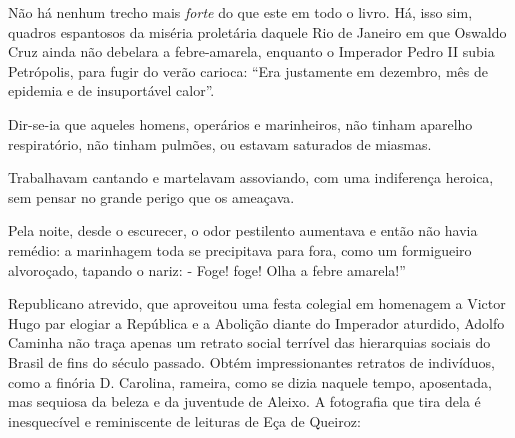 \documentclass[
  letterpaper,
  DIV=11,
  numbers=noendperiod]{scrreprt}
\begin{document}
Não há nenhum trecho mais \emph{forte} do que este em todo o livro. Há,
isso sim, quadros espantosos da miséria proletária daquele Rio de
Janeiro em que Oswaldo Cruz ainda não debelara a febre-amarela, enquanto
o Imperador Pedro II subia Petrópolis, para fugir do verão carioca:
``Era justamente em dezembro, mês de epidemia e de insuportável calor''.

Dir-se-ia que aqueles homens, operários e marinheiros, não tinham
aparelho respiratório, não tinham pulmões, ou estavam saturados de
miasmas.

Trabalhavam cantando e martelavam assoviando, com uma indiferença
heroica, sem pensar no grande perigo que os ameaçava.

Pela noite, desde o escurecer, o odor pestilento aumentava e então não
havia remédio: a marinhagem toda se precipitava para fora, como um
formigueiro alvoroçado, tapando o nariz: - Foge! foge! Olha a febre
amarela!''

Republicano atrevido, que aproveitou uma festa colegial em homenagem a
Victor Hugo par elogiar a República e a Abolição diante do Imperador
aturdido, Adolfo Caminha não traça apenas um retrato social terrível das
hierarquias sociais do Brasil de fins do século passado. Obtém
impressionantes retratos de indivíduos, como a finória D. Carolina,
rameira, como se dizia naquele tempo, aposentada, mas sequiosa da beleza
e da juventude de Aleixo. A fotografia que tira dela é inesquecível e
reminiscente de leituras de Eça de Queiroz:
\end{document}
